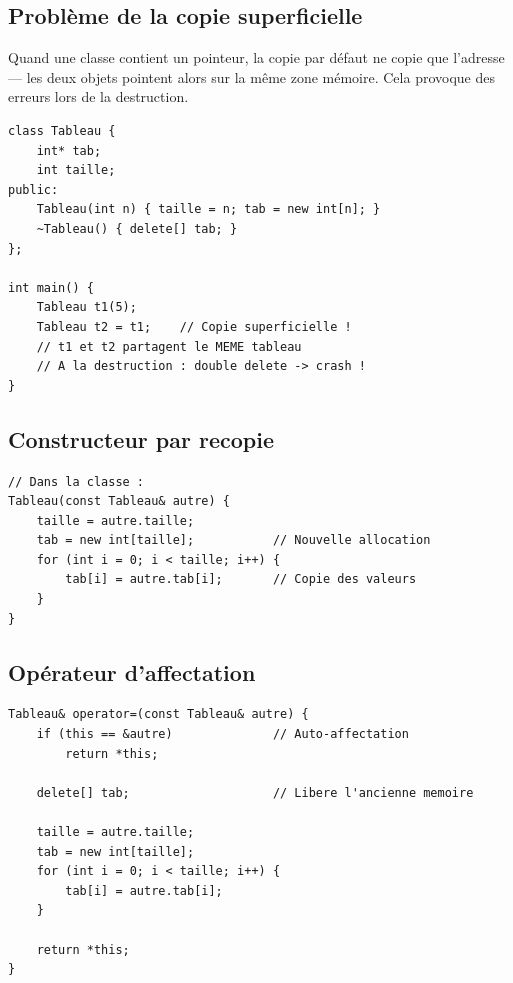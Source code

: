 \documentclass[12pt,a4paper]{article}
\begin{document}
\subsection{Problème de la copie superficielle}

Quand une classe contient un pointeur, la copie par défaut ne copie que l'adresse — les deux objets pointent alors sur la même zone mémoire. Cela provoque des erreurs lors de la destruction.

\begin{lstlisting}[style=cpp, caption={Problème de copie superficielle}]
class Tableau {
    int* tab;
    int taille;
public:
    Tableau(int n) { taille = n; tab = new int[n]; }
    ~Tableau() { delete[] tab; }
};

int main() {
    Tableau t1(5);
    Tableau t2 = t1;    // Copie superficielle !
    // t1 et t2 partagent le MEME tableau
    // A la destruction : double delete -> crash !
}
\end{lstlisting}

\subsection{Constructeur par recopie}

\begin{lstlisting}[style=cpp, caption={Constructeur par recopie (copie profonde)}]
// Dans la classe :
Tableau(const Tableau& autre) {
    taille = autre.taille;
    tab = new int[taille];           // Nouvelle allocation
    for (int i = 0; i < taille; i++) {
        tab[i] = autre.tab[i];       // Copie des valeurs
    }
}
\end{lstlisting}

\subsection{Opérateur d'affectation}

\begin{lstlisting}[style=cpp, caption={Opérateur d'affectation}]
Tableau& operator=(const Tableau& autre) {
    if (this == &autre)              // Auto-affectation
        return *this;

    delete[] tab;                    // Libere l'ancienne memoire

    taille = autre.taille;
    tab = new int[taille];
    for (int i = 0; i < taille; i++) {
        tab[i] = autre.tab[i];
    }

    return *this;
}
\end{lstlisting}
\end{document}
